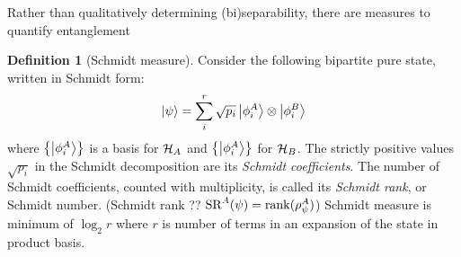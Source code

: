 \documentclass[
10pt,
aps,
pra,
linenumbers,
floatfix,
]{revtex4-2}
\theoremstyle{plain}
\theoremstyle{definition}
\newtheorem{definition}{Definition}
\newcommand{\ppartition}{\mathcal{P}}
\begin{document}

Rather than qualitatively determining (bi)separability, there are measures to quantify entanglement
\begin{definition}[Schmidt measure]\label{def:schmidt_measure}
	Consider the following bipartite pure state, written in Schmidt form:
	\begin{equation}
		\ket{\psi} = \sum_i^r \sqrt{p_i} \ket{\phi_i^A}\otimes\ket{\phi_i^B}
		\label{eq:schmidt_decomposition}
	\end{equation}
	where $\qty{\ket{\phi_i^A}}$ is a basis for $\mathcal{H}_A$ and $\qty{\ket{\phi_i^A}}$ for $\mathcal{H}_B$.
	The strictly positive values $\sqrt{p_i}$ in the Schmidt decomposition are its \emph{Schmidt coefficients}. 
	The number of Schmidt coefficients, counted with multiplicity, is called its \emph{Schmidt rank}, or Schmidt number. (Schmidt rank ?? $\text{SR}^A(\psi)=\rank(\rho_{\psi}^A)$)
	Schmidt measure is minimum of $\log_2 r$ where $r$ is number of terms in an expansion of the state in product basis.
\end{definition}
\end{document}
